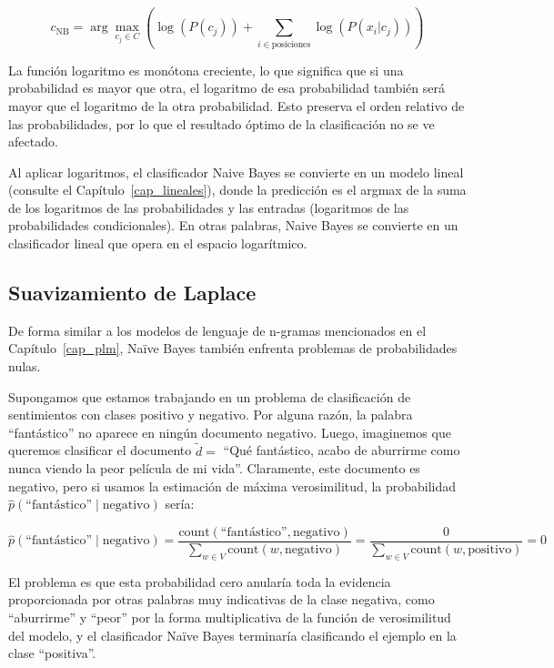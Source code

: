 \documentclass[11pt,fleqn]{book} %
\begin{document}
\[
c_{\text{NB}} = \arg\max_{c_j \in C} \left(\log(P(c_j)) + \sum_{i \in \text{posiciones}} \log(P(x_i | c_j))\right)
\]

La función logaritmo es monótona creciente, lo que significa que si una probabilidad es mayor que otra, el logaritmo de esa probabilidad también será mayor que el logaritmo de la otra probabilidad. Esto preserva el orden relativo de las probabilidades, por lo que el resultado óptimo de la clasificación no se ve afectado.

Al aplicar logaritmos, el clasificador Naive Bayes se convierte en un modelo lineal (consulte el Capítulo~\ref{cap_lineales}), donde la predicción es el argmax de la suma de los logaritmos de las probabilidades y las entradas (logaritmos de las probabilidades condicionales). En otras palabras, Naive Bayes se convierte en un clasificador lineal que opera en el espacio logarítmico.

\subsection{Suavizamiento de Laplace}

De forma similar a los modelos de lenguaje de n-gramas mencionados en el Capítulo~\ref{cap_plm}, Naïve Bayes también enfrenta problemas de probabilidades nulas.

Supongamos que estamos trabajando en un problema de clasificación de sentimientos con clases positivo y negativo. Por alguna razón, la palabra ``fantástico'' no aparece en ningún documento negativo. Luego, imaginemos que queremos clasificar el documento $\tilde{d}=$ ``Qué fantástico, acabo de aburrirme como nunca viendo la peor película de mi vida''. Claramente, este documento es negativo, pero si usamos la estimación de máxima verosimilitud, la probabilidad $\hat{p}(\text{``fantástico''} \mid \text{negativo})$ sería:

\[
\hat{p}(\text{``fantástico''} \mid \text{negativo}) = \frac{\text{count}(\text{``fantástico''}, \text{negativo})}{\sum_{w \in V} \text{count}(w, \text{negativo})} = \frac{0}{\sum_{w \in V} \text{count}(w, \text{positivo})} = 0
\]

El problema es que esta probabilidad cero anularía toda la evidencia proporcionada por otras palabras muy indicativas de la clase negativa, como ``aburrirme'' y ``peor'' por la forma multiplicativa de la función de verosimilitud del modelo, y el clasificador Naïve Bayes terminaría clasificando el ejemplo en la clase ``positiva''.
\end{document}

